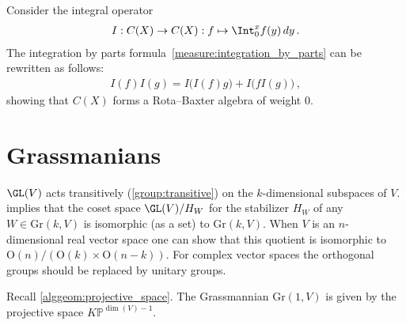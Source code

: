     \begin{example}
        Consider the integral operator
        \begin{gather}
            I:C(X)\rightarrow C(X):f\mapsto\Int_0^xf(y)\,dy\,.
        \end{gather}
        The integration by parts formula~\ref{measure:integration_by_parts} can be rewritten as follows:
        \begin{gather}
            I(f)I(g) = I\bigl(I(f)g\bigr) + I\bigl(fI(g)\bigr)\,,
        \end{gather}
        showing that $C(X)$ forms a Rota--Baxter algebra of weight 0.
    \end{example}

\section{Grassmanians}

    \begin{property}\label{linalgebra:grassmannian_construction}
        $\GL(V)$ acts transitively (\cref{group:transitive}) on the $k$-dimensional subspaces of $V$.  implies that the coset space $\GL(V)/H_W$ for the stabilizer $H_W$ of any $W\in\mathrm{Gr}(k,V)$ is isomorphic (as a set) to $\mathrm{Gr}(k,V)$. When $V$ is an $n$-dimensional real vector space one can show that this quotient is isomorphic to $\mathrm{O}(n)/(\mathrm{O}(k)\times\mathrm{O}(n-k))$. For complex vector spaces the orthogonal groups should be replaced by unitary groups.
    \end{property}

    \begin{example}
        Recall \cref{alggeom:projective_space}. The Grassmannian $\mathrm{Gr}(1,V)$ is given by the projective space $K\mathbb{P}^{\dim(V)-1}$.
    \end{example}

